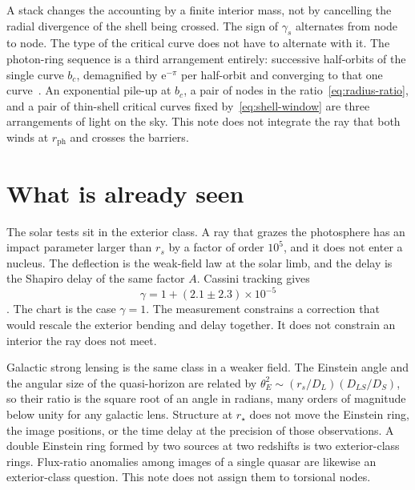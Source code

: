 \documentclass[a4paper]{article}
\begin{document}
A stack changes the accounting by a finite interior mass, not by cancelling the radial divergence of the shell being crossed. The sign of \(\gamma_s\) alternates from node to node. The type of the critical curve does not have to alternate with it. The photon-ring sequence is a third arrangement entirely: successive half-orbits of the single curve \(b_c\), demagnified by \(\mathrm{e}^{-\pi}\) per half-orbit and converging to that one curve~\cite{Johnson2020}. An exponential pile-up at \(b_c\), a pair of nodes in the ratio~\eqref{eq:radius-ratio}, and a pair of thin-shell critical curves fixed by~\eqref{eq:shell-window} are three arrangements of light on the sky. This note does not integrate the ray that both winds at \(r_{\mathrm{ph}}\) and crosses the barriers.

\section{What is already seen}
\label{sec:observations}

The solar tests sit in the exterior class. A ray that grazes the photosphere has an impact parameter larger than \(r_s\) by a factor of order \(10^5\), and it does not enter a nucleus. The deflection is the weak-field law at the solar limb, and the delay is the Shapiro delay of the same factor \(A\). Cassini tracking gives
\begin{equation}
\label{eq:cassini}
\gamma=1+(2.1\pm 2.3)\times 10^{-5}
\end{equation}
\cite{Bertotti2003}. The chart is the case \(\gamma=1\). The measurement constrains a correction that would rescale the exterior bending and delay together. It does not constrain an interior the ray does not meet.

Galactic strong lensing is the same class in a weaker field. The Einstein angle and the angular size of the quasi-horizon are related by \(\theta_E^2\sim(r_s/D_L)(D_{LS}/D_S)\), so their ratio is the square root of an angle in radians, many orders of magnitude below unity for any galactic lens. Structure at \(r_\star\) does not move the Einstein ring, the image positions, or the time delay at the precision of those observations. A double Einstein ring formed by two sources at two redshifts is two exterior-class rings. Flux-ratio anomalies among images of a single quasar are likewise an exterior-class question. This note does not assign them to torsional nodes.
\end{document}

